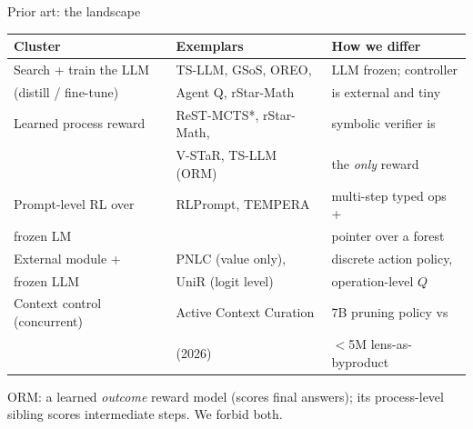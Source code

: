 \documentclass[aspectratio=169]{beamer}
\begin{document}
\begin{frame}{Prior art: the landscape}
  \footnotesize
  \begin{center}
    \begin{tabular}{lll}
      \toprule
      Cluster & Exemplars & How we differ \\
      \midrule
      Search + train the LLM & TS-LLM, GSoS, OREO, & LLM frozen; controller \\
      \; (distill / fine-tune) & Agent Q, rStar-Math & is external and tiny \\
      \addlinespace
      Learned process reward & ReST-MCTS*, rStar-Math, & symbolic verifier is \\
      & V-STaR, TS-LLM (ORM) & the \emph{only} reward \\
      \addlinespace
      Prompt-level RL over & RLPrompt, TEMPERA & multi-step typed ops + \\
      \; frozen LM & & pointer over a forest \\
      \addlinespace
      External module + & PNLC (value only), & discrete action policy, \\
      \; frozen LLM & UniR (logit level) & operation-level $Q$ \\
      \addlinespace
      Context control (concurrent) & Active Context Curation & 7B pruning policy vs \\
      & (2026) & $<$5M lens-as-byproduct \\
      \bottomrule
    \end{tabular}
  \end{center}
  \smallskip
  \footnotesize ORM: a learned \emph{outcome} reward model (scores final
  answers); its process-level sibling scores intermediate steps. We forbid
  both.
\end{frame}
\end{document}
